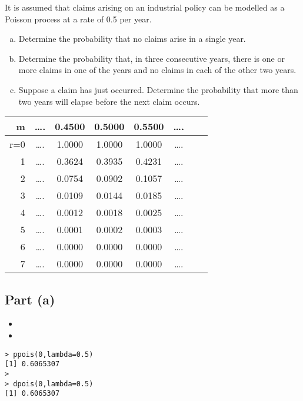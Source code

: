 \documentclass[a4paper,12pt]{article}
\begin{document}
\large 
\noindent  It is assumed that claims arising on an industrial policy can be modelled as a Poisson
process at a rate of 0.5 per year.
\begin{enumerate}[(a)] 
\item Determine the probability that no claims arise in a single year. 
\item Determine the probability that, in three consecutive years, there is one or more
claims in one of the years and no claims in each of the other two years. 
\item  Suppose a claim has just occurred. Determine the probability that more than
two years will elapse before the next claim occurs. 
\end{enumerate}


\begin{center}
\begin{tabular}{r||ccccccc}
m	&….&	0.4500	&	0.5000	&	0.5500	&	….	\\ \hline \hline
r=0	&….&	1.0000	&	1.0000	&	1.0000	&	….	\\ \hline
1	&….&	0.3624	&	0.3935	&	0.4231	&	….	\\ \hline
2	&….&	0.0754	&	0.0902	&	0.1057	&	….	\\ \hline
3	&….&	0.0109	&	0.0144	&	0.0185	&	….	\\ \hline
4	&….&	0.0012	&	0.0018	&	0.0025	&	….	\\ \hline
5	&….&	0.0001	&	0.0002	&	0.0003	&	….	\\ \hline
6	&….&	0.0000	&	0.0000	&	0.0000	&	….	\\ \hline
7	&….&	0.0000	&	0.0000	&	0.0000	&	….	\\ \hline

\end{tabular}
\end{center}


\subsection*{Part (a)}

\begin{itemize}
\item
\item
\end{itemize}
\begin{framed}
\begin{verbatim}
> ppois(0,lambda=0.5)
[1] 0.6065307
>
> dpois(0,lambda=0.5)
[1] 0.6065307
\end{verbatim}
\end{framed}
\end{document}
